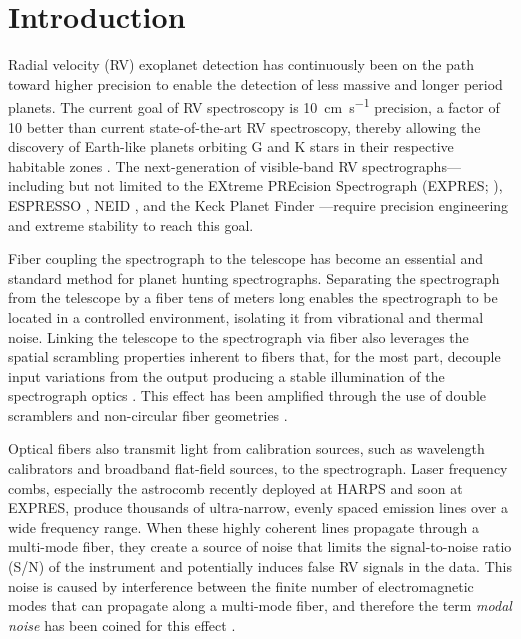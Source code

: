 \section{Introduction}
\label{sec:intro}

Radial velocity (RV) exoplanet detection has continuously been on the path toward higher precision to enable the detection of less massive and longer period planets. The current goal of RV spectroscopy is \SI{10}{\centi\meter\per\second} precision, a factor of 10 better than current state-of-the-art RV spectroscopy, thereby allowing the discovery of Earth-like planets orbiting G and K stars in their respective habitable zones \citep{fischer_state_2016}. The next-generation of visible-band RV spectrographs---including but not limited to the EXtreme PREcision Spectrograph (EXPRES; \citet{jurgenson_expres_2016}), ESPRESSO \citep{megevand_espresso_2012}, NEID \citep{schwab_design_2016}, and the Keck Planet Finder \citep{gibson_kpf_2016}---require precision engineering and extreme stability to reach this goal.

Fiber coupling the spectrograph to the telescope has become an essential and standard method for planet hunting spectrographs. Separating the spectrograph from the telescope by a fiber tens of meters long enables the spectrograph to be located in a controlled environment, isolating it from vibrational and thermal noise. Linking the telescope to the spectrograph via fiber also leverages the spatial scrambling properties inherent to fibers that, for the most part, decouple input variations from the output producing a stable illumination of the spectrograph optics \citep{hunter_scrambling_1992}. This effect has been amplified through the use of double scramblers \citep{halverson_efficient_2015, spronck_fiber_2015} and non-circular fiber geometries \citep{chazelas_new_2010, spronck_use_2012, plavchan_precision_2013}.

Optical fibers also transmit light from calibration sources, such as wavelength calibrators and broadband flat-field sources, to the spectrograph. Laser frequency combs, especially the  astrocomb \citep{probst_laser_2014} recently deployed at HARPS and soon at EXPRES, produce thousands of ultra-narrow, evenly spaced emission lines over a wide frequency range. When these highly coherent lines propagate through a multi-mode fiber, they create a source of noise that limits the signal-to-noise ratio (S/N) of the instrument and potentially induces false RV signals in the data. This noise is caused by interference between the finite number of electromagnetic modes that can propagate along a multi-mode fiber, and therefore the term \textit{modal noise} has been coined for this effect \citep{epworth_phenomenon_1978}.

